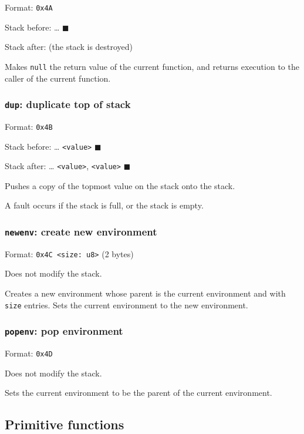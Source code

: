 Format: \texttt{0x4A}

Stack before: \ldots{} \(\blacksquare\)

Stack after: (the stack is destroyed)

Makes \texttt{null} the return value of the current function, and
returns execution to the caller of the current function.

\subsubsection{\texorpdfstring{\texttt{dup}: duplicate top of
stack}{dup: duplicate top of stack}}

Format: \texttt{0x4B}

Stack before: \ldots{} \texttt{\textless{}value\textgreater{}}
\(\blacksquare\)

Stack after: \ldots{} \texttt{\textless{}value\textgreater{}},
\texttt{\textless{}value\textgreater{}} \(\blacksquare\)

Pushes a copy of the topmost value on the stack onto the stack.

A fault occurs if the stack is full, or the stack is empty.

\subsubsection{\texorpdfstring{\texttt{newenv}: create new
environment}{newenv: create new environment}}

Format: \texttt{0x4C\ \textless{}size:\ u8\textgreater{}} (2 bytes)

Does not modify the stack.

Creates a new environment whose parent is the current environment and
with \texttt{size} entries. Sets the current environment to the new
environment.

\subsubsection{\texorpdfstring{\texttt{popenv}: pop
environment}{popenv: pop environment}}

Format: \texttt{0x4D}

Does not modify the stack.

Sets the current environment to be the parent of the current
environment.

\subsection{Primitive functions}


